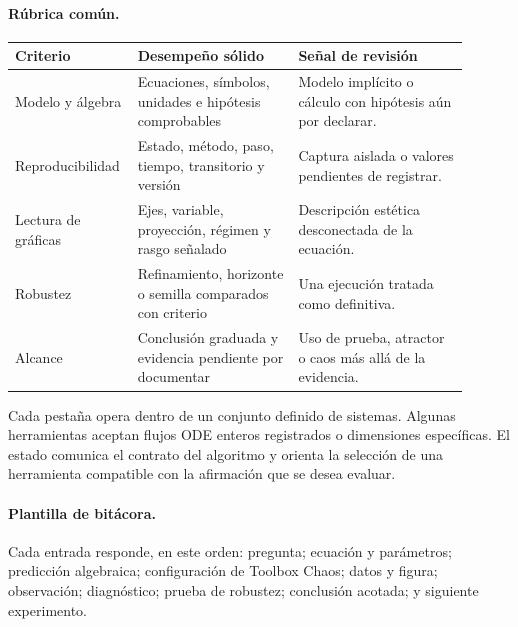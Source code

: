\paragraph{Rúbrica común.}
\begin{longtable}{>{\raggedright\arraybackslash}p{0.20\linewidth}
                  >{\raggedright\arraybackslash}p{0.34\linewidth}
                  >{\raggedright\arraybackslash}p{0.36\linewidth}}
\toprule
Criterio & Desempeño sólido & Señal de revisión \\
\midrule
\endhead
Modelo y álgebra & Ecuaciones, símbolos, unidades e hipótesis comprobables &
Modelo implícito o cálculo con hipótesis aún por declarar.\\
Reproducibilidad & Estado, método, paso, tiempo, transitorio y versión &
Captura aislada o valores pendientes de registrar.\\
Lectura de gráficas & Ejes, variable, proyección, régimen y rasgo señalado &
Descripción estética desconectada de la ecuación.\\
Robustez & Refinamiento, horizonte o semilla comparados con criterio &
Una ejecución tratada como definitiva.\\
Alcance & Conclusión graduada y evidencia pendiente por documentar &
Uso de prueba, atractor o caos más allá de la evidencia.\\
\bottomrule
\end{longtable}

\begin{warningbox}
Cada pestaña opera dentro de un conjunto definido de sistemas. Algunas herramientas aceptan
flujos ODE enteros registrados o dimensiones específicas. El estado
 comunica el contrato del algoritmo y orienta la selección de una
herramienta compatible con la afirmación que se desea evaluar.
\end{warningbox}

\paragraph{Plantilla de bitácora.}
Cada entrada responde, en este orden: pregunta; ecuación y parámetros; predicción
algebraica; configuración de Toolbox Chaos; datos y figura; observación; diagnóstico;
prueba de robustez; conclusión acotada; y siguiente experimento.
